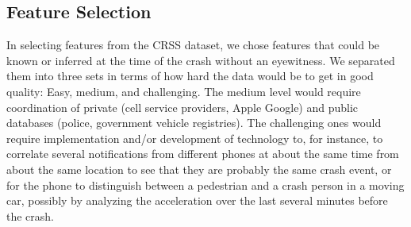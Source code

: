\subsection{Feature Selection}

In selecting features from the CRSS dataset, we chose features that could be known or inferred at the time of the crash without an eyewitness.  We separated them into three sets in terms of how hard the data would be to get in good quality:  Easy, medium, and challenging.  The medium level would require coordination of private (cell service providers, Apple Google) and public databases (police, government vehicle registries).  The challenging ones would require implementation and/or development of technology to, for instance, to correlate several notifications from different phones at about the same time from about the same location to see that they are probably the same crash event, or for the phone to distinguish between a pedestrian and a crash person in a moving car, possibly by analyzing the acceleration over the last several minutes before the crash.  


